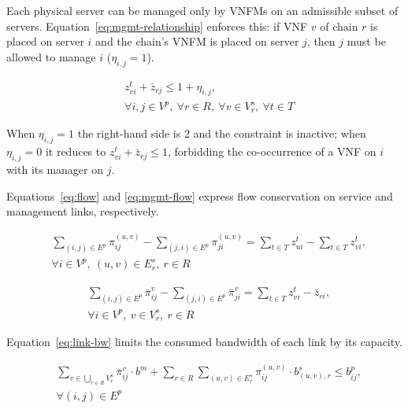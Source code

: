 Each physical server can be managed only by VNFMs on an admissible subset of
servers. Equation~\eqref{eq:mgmt-relationship} enforces this: if VNF \(v\) of
chain \(r\) is placed on server \(i\) and the chain's VNFM is placed on server
\(j\), then \(j\) must be allowed to manage \(i\) (\(\eta_{i,j} = 1\)).

\begin{equation}\label{eq:mgmt-relationship}
\begin{aligned}
& z^t_{vi} + \bar{z}_{rj} \le 1 + \eta_{i,j}, \\
& \forall i, j \in V^p,\ \forall r \in R,\ \forall v \in V^s_r,\ \forall t \in T
\end{aligned}
\end{equation}

When \(\eta_{i,j} = 1\) the right-hand side is \(2\) and the constraint is
inactive; when \(\eta_{i,j} = 0\) it reduces to \(z^t_{vi} + \bar{z}_{rj} \le 1\),
forbidding the co-occurrence of a VNF on \(i\) with its manager on \(j\).

Equations~\eqref{eq:flow} and \eqref{eq:mgmt-flow} express flow conservation on
service and management links, respectively.

\begin{equation}\label{eq:flow}
\begin{aligned}
& \sum_{(i,j) \in E^p} \pi^{(u,v)}_{ij} - \sum_{(j,i) \in E^p} \pi^{(u,v)}_{ji} = \sum_{t \in T} z^t_{ui} - \sum_{t \in T} z^t_{vi}, \\
& \forall i \in V^p,\ (u,v) \in E^s_r,\ r \in R
\end{aligned}
\end{equation}

\begin{equation}\label{eq:mgmt-flow}
\begin{aligned}
& \sum_{(i,j) \in E^p} \bar{\pi}^v_{ij} - \sum_{(j,i) \in E^p} \bar{\pi}^v_{ji} = \sum_{t \in T} z^t_{vi} - \bar{z}_{ri}, \\
& \forall i \in V^p,\ v \in V^s_r,\ r \in R
\end{aligned}
\end{equation}

Equation~\eqref{eq:link-bw} limits the consumed bandwidth of each link by its
capacity.

\begin{equation}\label{eq:link-bw}
\begin{aligned}
& \sum_{v \in \bigcup_{r \in R} V^s_r} \bar{\pi}^v_{ij} \cdot b^m + \sum_{r \in R} \sum_{(u,v) \in E^s_r} \pi^{(u,v)}_{ij} \cdot b^s_{(u,v),r} \le b^p_{ij}, \\
& \forall (i,j) \in E^p
\end{aligned}
\end{equation}

